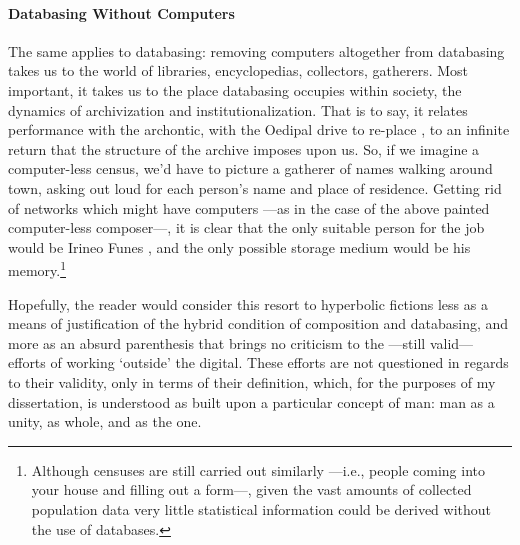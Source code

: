 \paragraph{Databasing Without Computers}
The same applies to databasing: removing computers altogether from databasing takes us to the world of libraries, encyclopedias, collectors, gatherers. Most important, it takes us to the place databasing occupies within society, the dynamics of archivization and institutionalization. That is to say, it relates performance with the archontic, with the Oedipal drive to re-place , to an infinite return that the structure of the archive imposes upon us. So, if we imagine a computer-less census, we'd have to picture a gatherer of names walking around town, asking out loud for each person's name and place of residence. Getting rid of networks which might have computers ---as in the case of the above painted computer-less composer---, it is clear that the only suitable person for the job would be Irineo Funes , and the only possible storage medium would be his memory.\footnote{Although censuses are still carried out similarly ---i.e., people coming into your house and filling out a form---, given the vast amounts of collected population data very little statistical information could be derived without the use of databases.}

Hopefully, the reader would consider this resort to hyperbolic fictions less as a means of justification of the hybrid condition of composition and databasing, and more as an absurd parenthesis that brings no criticism to the ---still valid--- efforts of working `outside' the digital. These efforts are not questioned in regards to their validity, only in terms of their definition, which, for the purposes of my dissertation, is understood as built upon a particular concept of man: man as a unity, as whole, and as the one.